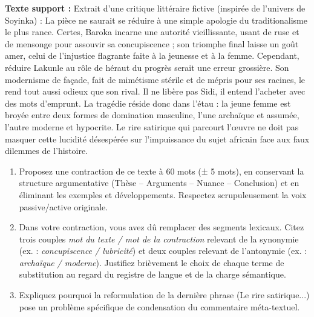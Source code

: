 \documentclass[11pt]{article}
\begin{document}
\begin{exercice}
\textbf{Texte support :} Extrait d'une critique littéraire fictive (inspirée de l'univers de Soyinka) : 
\og La pièce ne saurait se réduire à une simple apologie du traditionalisme le plus rance. Certes, Baroka incarne une autorité vieillissante, usant de ruse et de mensonge pour assouvir sa concupiscence ; son triomphe final laisse un goût amer, celui de l'injustice flagrante faite à la jeunesse et à la femme. Cependant, réduire Lakunle au rôle de héraut du progrès serait une erreur grossière. Son modernisme de façade, fait de mimétisme stérile et de mépris pour ses racines, le rend tout aussi odieux que son rival. Il ne libère pas Sidi, il entend l'acheter avec des mots d'emprunt. La tragédie réside donc dans l'étau : la jeune femme est broyée entre deux formes de domination masculine, l'une archaïque et assumée, l'autre moderne et hypocrite. Le rire satirique qui parcourt l'œuvre ne doit pas masquer cette lucidité désespérée sur l'impuissance du sujet africain face aux faux dilemmes de l'histoire. \fg
\begin{enumerate}
    \item Proposez une contraction de ce texte à 60 mots (± 5 mots), en conservant la structure argumentative (Thèse -- Arguments -- Nuance -- Conclusion) et en éliminant les exemples et développements. Respectez scrupuleusement la voix passive/active originale.
    \item Dans votre contraction, vous avez dû remplacer des segments lexicaux. Citez trois couples \textit{mot du texte / mot de la contraction} relevant de la synonymie (ex. : \textit{concupiscence / lubricité}) et deux couples relevant de l'antonymie (ex. : \textit{archaïque / moderne}). Justifiez brièvement le choix de chaque terme de substitution au regard du registre de langue et de la charge sémantique.
    \item Expliquez pourquoi la reformulation de la dernière phrase (\og Le rire satirique...\fg) pose un problème spécifique de condensation du commentaire méta-textuel.
\end{enumerate}
\end{exercice}
\end{document}
